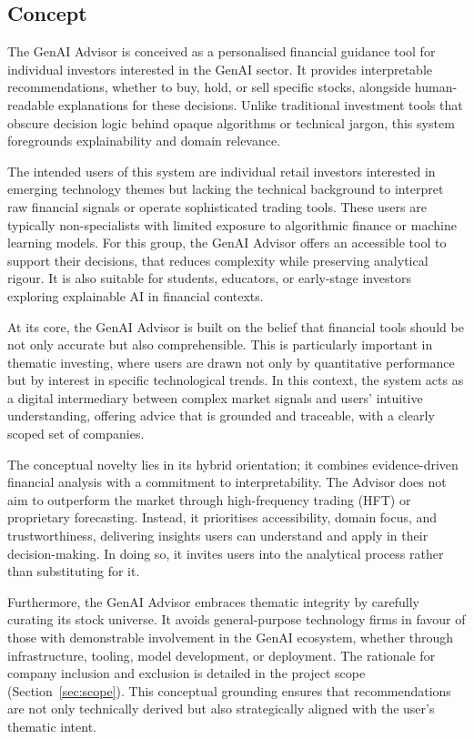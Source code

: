 \subsection{Concept}

The GenAI Advisor is conceived as a personalised financial guidance tool for individual investors interested in the GenAI sector. It provides interpretable recommendations, whether to buy, hold, or sell specific stocks, alongside human-readable explanations for these decisions. Unlike traditional investment tools that obscure decision logic behind opaque algorithms or technical jargon, this system foregrounds explainability and domain relevance.

The intended users of this system are individual retail investors interested in emerging technology themes but lacking the technical background to interpret raw financial signals or operate sophisticated trading tools. These users are typically non-specialists with limited exposure to algorithmic finance or machine learning models. For this group, the GenAI Advisor offers an accessible tool to support their decisions, that reduces complexity while preserving analytical rigour. It is also suitable for students, educators, or early-stage investors exploring explainable AI in financial contexts.

At its core, the GenAI Advisor is built on the belief that financial tools should be not only accurate but also comprehensible. This is particularly important in thematic investing, where users are drawn not only by quantitative performance but by interest in specific technological trends. In this context, the system acts as a digital intermediary between complex market signals and users' intuitive understanding, offering advice that is grounded and traceable, with a clearly scoped set of companies.

The conceptual novelty lies in its hybrid orientation; it combines evidence-driven financial analysis with a commitment to interpretability. The Advisor does not aim to outperform the market through high-frequency trading (HFT) or proprietary forecasting. Instead, it prioritises accessibility, domain focus, and trustworthiness, delivering insights users can understand and apply in their decision-making. In doing so, it invites users into the analytical process rather than substituting for it.

Furthermore, the GenAI Advisor embraces thematic integrity by carefully curating its stock universe. It avoids general-purpose technology firms in favour of those with demonstrable involvement in the GenAI ecosystem, whether through infrastructure, tooling, model development, or deployment. The rationale for company inclusion and exclusion is detailed in the project scope (Section~\ref{sec:scope}). This conceptual grounding ensures that recommendations are not only technically derived but also strategically aligned with the user's thematic intent.

